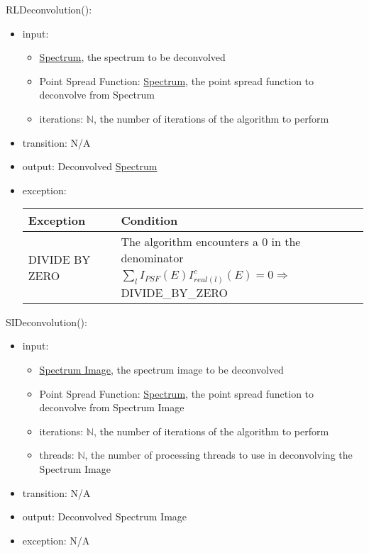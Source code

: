 \documentclass[12pt, titlepage]{article}
\begin{document}
\noindent RLDeconvolution():
\begin{itemize}
    \item input: 
    \begin{itemize}
        \item \hyperref[Mod:Spectrum]{Spectrum}, the spectrum to be
        deconvolved
        \item Point Spread Function: \hyperref[Mod:Spectrum]{Spectrum}, the
        point spread function to deconvolve from Spectrum
        \item iterations: $\mathbb{N}$, the number of iterations of the
        algorithm to perform
    \end{itemize}
    \item transition: N/A
    \item output: Deconvolved \hyperref[Mod:Spectrum]{Spectrum}
    \item exception:
    \begin{center}
        \begin{tabular}{p{3.5cm} p{12cm}}
            \toprule[0.15em]
            \textbf{Exception} & \textbf{Condition}\\
            \midrule[0.1em]
            \multirow{2}{0.25\textwidth}{DIVIDE BY ZERO} & The algorithm
            encounters a 0 in the denominator\\ 
            & $\sum_l{I_{PSF}(E)I_{real(l)}^c(E)} = 0 \Rightarrow$
            DIVIDE\_BY\_ZERO\\ 
            \bottomrule[0.15em]
        \end{tabular}
    \end{center}
\end{itemize}

\noindent SIDeconvolution():
\begin{itemize}
    \item input: 
    \begin{itemize}
        \item \hyperref[Mod:SI]{Spectrum Image}, the spectrum image to be
        deconvolved
        \item Point Spread Function: \hyperref[Mod:Spectrum]{Spectrum}, the
        point spread function to deconvolve from Spectrum Image
        \item iterations: $\mathbb{N}$, the number of iterations of the
        algorithm to perform
        \item threads: $\mathbb{N}$, the number of processing threads to use in
        deconvolving the Spectrum Image
    \end{itemize}
    \item transition: N/A
    \item output: Deconvolved Spectrum Image
    \item exception: N/A
\end{itemize}
\end{document}

